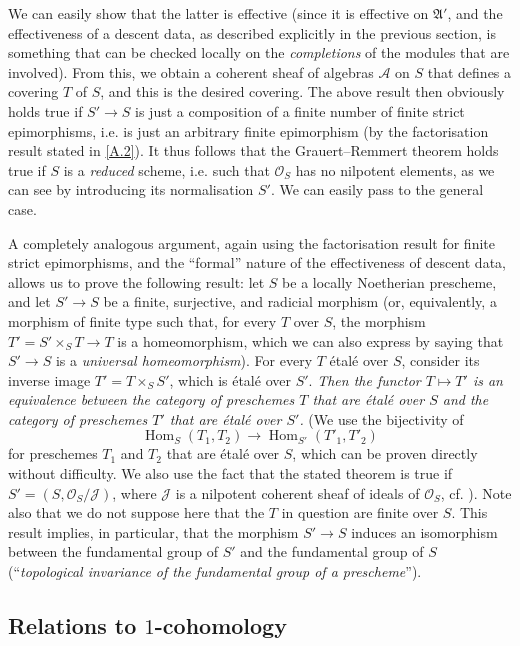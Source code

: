 \documentclass{article}
\theoremstyle{plain}
\theoremstyle{definition}
\newcommand{\sh}[1]{{\mathscr{#1}}}
\newcommand{\fk}[1]{{\mathfrak{#1}}}
\DeclareMathOperator{\Hom}{Hom}
\newcommand{\oldpage}[1]{\marginpar{\footnotesize$\Big\vert$ \textit{p.~#1}}}
\begin{document}
We can easily show that the latter is effective (since it is effective on $\fk{A}'$, and the effectiveness of a descent data, as described explicitly in the previous section, is something that can be checked locally on the \emph{completions} of the modules that are involved).
From this, we obtain a coherent sheaf of algebras $\sh{A}$ on $S$ that defines a covering $T$ of $S$, and this is the desired covering.
The above result then obviously holds true if $S'\to S$ is just a composition of a finite number of finite strict epimorphisms, i.e. is just an arbitrary finite epimorphism (by the factorisation result stated in \cref{A.2}).
It thus follows that the Grauert--Remmert theorem holds true if $S$ is a \emph{reduced} scheme, i.e. such that $\sh{O}_S$ has no nilpotent elements, as we can see by introducing its normalisation $S'$.
We can easily pass to the general case.

A completely analogous argument, again using the factorisation result for finite strict epimorphisms, and the ``formal'' nature of the effectiveness of descent data, allows us to prove the following result:
let $S$ be a locally Noetherian prescheme, and let $S'\to S$ be a finite, surjective, and radicial morphism (or, equivalently, a morphism of finite type such that, for every $T$ over $S$, the morphism $T'=S'\times_S T\to T$ is a homeomorphism, which we can also express by saying that $S'\to S$ is a \emph{universal homeomorphism}).
For every $T$ \'{e}tal\'{e} over $S$, consider its inverse image $T'=T\times_S S'$, which is \'{e}tal\'{e} over $S'$.
\emph{Then the functor $T\mapsto T'$ is an equivalence between the category of preschemes $T$ that are \'{e}tal\'{e} over $S$ and the category of preschemes $T'$ that are \'{e}tal\'{e} over $S'$.}
(We use the bijectivity of
\[
  \Hom_S(T_1,T_2) \to \Hom_{S'}(T'_1,T'_2)
\]
for preschemes $T_1$ and $T_2$ that are \'{e}tal\'{e} over $S$, which can be proven directly without difficulty. We also use the fact that the stated theorem is true if $S'=(S,\sh{O}_S/\sh{J})$,
\oldpage{190-12}
where $\sh{J}$ is a nilpotent coherent sheaf of ideals of $\sh{O}_S$, cf. \cite[Lemma~6]{4}).
Note also that we do not suppose here that the $T$ in question are finite over $S$.
This result implies, in particular, that the morphism $S'\to S$ induces an isomorphism between the fundamental group of $S'$ and the fundamental group of $S$ (``\emph{topological invariance of the fundamental group of a prescheme}'').


\subsection{Relations to \texorpdfstring{$1$}{1}-cohomology}
\label{A.4}
\end{document}
